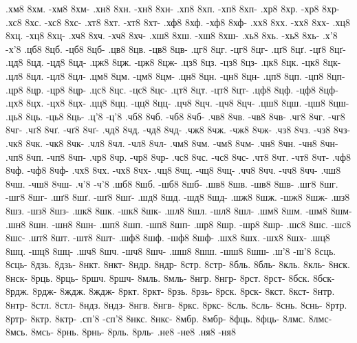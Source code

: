 {.хм8 8хм. -хм8 8хм-
.хн8 8хн. -хн8 8хн-
.хп8 8хп. -хп8 8хп-
.хр8 8хр. -хр8 8хр-
.хс8 8хс. -хс8 8хс-
.хт8 8хт. -хт8 8хт-
.хф8 8хф. -хф8 8хф-
.хх8 8хх. -хх8 8хх-
.хц8 8хц. -хц8 8хц-
.хч8 8хч. -хч8 8хч-
.хш8 8хш. -хш8 8хш-
.хь8 8хь. -хь8 8хь-
.х'8 -х'8
.цб8 8цб. -цб8 8цб-
.цв8 8цв. -цв8 8цв-
.цг8 8цг. -цг8 8цг-
.цґ8 8цґ. -цґ8 8цґ-
.цд8 8цд. -цд8 8цд-
.цж8 8цж. -цж8 8цж-
.цз8 8цз. -цз8 8цз-
.цк8 8цк. -цк8 8цк-
.цл8 8цл. -цл8 8цл-
.цм8 8цм. -цм8 8цм-
.цн8 8цн. -цн8 8цн-
.цп8 8цп. -цп8 8цп-
.цр8 8цр. -цр8 8цр-
.цс8 8цс. -цс8 8цс-
.цт8 8цт. -цт8 8цт-
.цф8 8цф. -цф8 8цф-
.цх8 8цх. -цх8 8цх-
.цц8 8цц. -цц8 8цц-
.цч8 8цч. -цч8 8цч-
.цш8 8цш. -цш8 8цш-
.ць8 8ць. -ць8 8ць-
.ц'8 -ц'8
.чб8 8чб. -чб8 8чб-
.чв8 8чв. -чв8 8чв-
.чг8 8чг. -чг8 8чг-
.чґ8 8чґ. -чґ8 8чґ-
.чд8 8чд. -чд8 8чд-
.чж8 8чж. -чж8 8чж-
.чз8 8чз. -чз8 8чз-
.чк8 8чк. -чк8 8чк-
.чл8 8чл. -чл8 8чл-
.чм8 8чм. -чм8 8чм-
.чн8 8чн. -чн8 8чн-
.чп8 8чп. -чп8 8чп-
.чр8 8чр. -чр8 8чр-
.чс8 8чс. -чс8 8чс-
.чт8 8чт. -чт8 8чт-
.чф8 8чф. -чф8 8чф-
.чх8 8чх. -чх8 8чх-
.чц8 8чц. -чц8 8чц-
.чч8 8чч. -чч8 8чч-
.чш8 8чш. -чш8 8чш-
.ч'8 -ч'8
.шб8 8шб. -шб8 8шб-
.шв8 8шв. -шв8 8шв-
.шг8 8шг. -шг8 8шг-
.шґ8 8шґ. -шґ8 8шґ-
.шд8 8шд. -шд8 8шд-
.шж8 8шж. -шж8 8шж-
.шз8 8шз. -шз8 8шз-
.шк8 8шк. -шк8 8шк-
.шл8 8шл. -шл8 8шл-
.шм8 8шм. -шм8 8шм-
.шн8 8шн. -шн8 8шн-
.шп8 8шп. -шп8 8шп-
.шр8 8шр. -шр8 8шр-
.шс8 8шс. -шс8 8шс-
.шт8 8шт. -шт8 8шт-
.шф8 8шф. -шф8 8шф-
.шх8 8шх. -шх8 8шх-
.шц8 8шц. -шц8 8шц-
.шч8 8шч. -шч8 8шч-
.шш8 8шш. -шш8 8шш-
.ш'8 -ш'8
%
%
%
8сць. 8сць-
8дзь. 8дзь-
8нкт. 8нкт-
8ндр. 8ндр-
8стр. 8стр-
8бль. 8бль-
8кль. 8кль-
8нск. 8нск-
8рць. 8рць-
8ршч. 8ршч-
8мль. 8мль-
8нгр. 8нгр-
8рст. 8рст-
8бск. 8бск-
8рдж. 8рдж-
8ждж. 8ждж-
8ркт. 8ркт-
8рзь. 8рзь-
8рск. 8рск-
8кст. 8кст-
8нтр. 8нтр-
8стл. 8стл-
8ндз. 8ндз-
8нгв. 8нгв-
8ркс. 8ркс-
8сль. 8сль-
8снь. 8снь-
8ртр. 8ртр-
8ктр. 8ктр-
.сп'8 -сп'8
8нкс. 8нкс-
8мбр. 8мбр-
8фць. 8фць-
8лмс. 8лмс-
8мсь. 8мсь-
8рнь. 8рнь-
8рль. 8рль-
%
%
%
.не8 -не8
.ня8 -ня8
%
}
